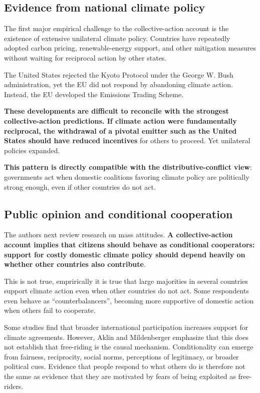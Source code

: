 \subsection{Evidence from national climate policy}

The first major empirical challenge to the collective-action account is the existence of extensive unilateral climate policy. Countries have repeatedly adopted carbon pricing, renewable-energy support, and other mitigation measures without waiting for reciprocal action by other states.

The United States rejected the Kyoto Protocol under the George W. Bush administration, yet the EU did not respond by abandoning climate action. Instead, the EU developed the Emissions Trading Scheme.

\textbf{These developments are difficult to reconcile with the strongest collective-action predictions. If climate action were fundamentally reciprocal, the withdrawal of a pivotal emitter such as the United States should have reduced incentives} for others to proceed. Yet unilateral policies expanded.

\textbf{This pattern is directly compatible with the distributive-conflict view}: governments act when domestic coalitions favoring climate policy are politically strong enough, even if other countries do not act.

\subsection{Public opinion and conditional cooperation}

The authors next review research on mass attitudes. \textbf{A collective-action account implies that citizens should behave as conditional cooperators: support for costly domestic climate policy should depend heavily on whether other countries also contribute}. 

This is not true, emprirically it is true that large majorities in several countries support climate action even when other countries do not act. Some respondents even behave as ``counterbalancers'', becoming more supportive of domestic action when others fail to cooperate.

Some studies find that broader international participation increases support for climate agreements. However, Aklin and Mildenberger emphasize that this does not establish that free-riding is the causal mechanism. Conditionality can emerge from fairness, reciprocity, social norms, perceptions of legitimacy, or broader political cues. Evidence that people respond to what others do is therefore not the same as evidence that they are motivated by fears of being exploited as free-riders.

